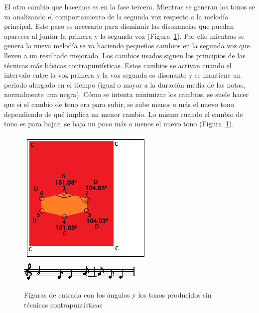El otro cambio que hacemos es en la fase tercera. Mientras se generan los tonos se va analizando el comportamiento de la segunda voz respecto a la melodía principal. Este paso es necesario para disminuir las disonancias que puedan aparecer al juntar la primera y la segunda voz (Figura~\ref{fig:Figura3Voz2}). Por ello mientras se genera la nueva melodía se va haciendo pequeños cambios en la segunda voz que lleven a un resultado mejorado. Los cambios usados siguen los principios de las técnicas más básicas contrapuntísticas. Estos cambios se activan cuando el intervalo entre la voz primera y la voz segunda es disonante y se mantiene un periodo alargado en el tiempo (igual o mayor a la duración media de las notas, normalmente una negra). Cómo se intenta minimizar los cambios, se suele hacer que si el cambio de tono era para subir, se sube menos o más el nuevo tono dependiendo de qué implica un menor cambio. Lo mismo cuando el cambio de tono es para bajar, se baja un poco más o menos el nuevo tono (Figura~\ref{fig:Figura3Voz2}).

		\begin{figure}[htbp]
		\centering
		\hspace*{0.0in}
		\includegraphics[scale=1]{graphics/simpletest4-F3.png}
		\includegraphics[scale=1]{graphics/simpletest4-F3-MEL2partitura.png}
		\caption{Figuras de entrada con los ángulos y los tonos producidos sin técnicas contrapuntísticas}
		\label{fig:Figura3Voz2}
		\end{figure}

